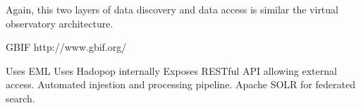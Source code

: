 \documentclass{article}
\begin{document}
Again, this two layers of data discovery and data access
is similar the virtual observatory architecture.



GBIF
http://www.gbif.org/

Uses EML
Uses Hadopop internally
Exposes RESTful API allowing external access.
Automated injestion and processing pipeline.
Apache SOLR for federated search.





 



















%
%

\printbibliography
\end{document}
